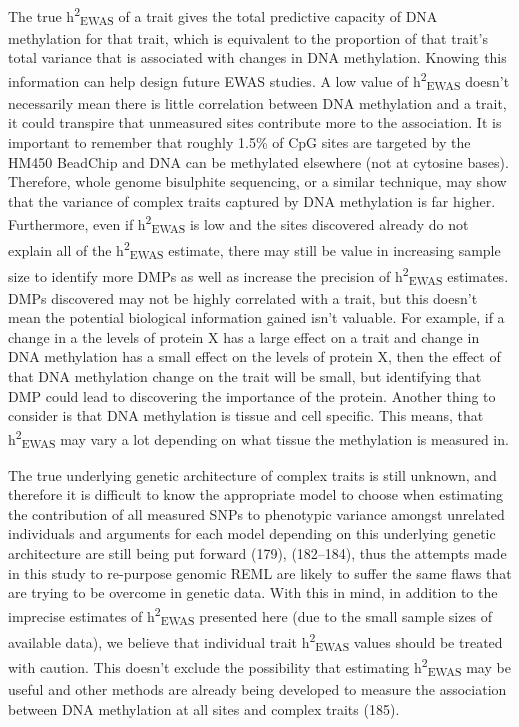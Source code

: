 \documentclass[11pt,oneside]{bristolthesis}
\begin{document}
The true h\textsuperscript{2}\textsubscript{EWAS} of a trait gives the total predictive capacity of DNA methylation for that trait, which is equivalent to the proportion of that trait's total variance that is associated with changes in DNA methylation. Knowing this information can help design future EWAS studies. A low value of h\textsuperscript{2}\textsubscript{EWAS} doesn't necessarily mean there is little correlation between DNA methylation and a trait, it could transpire that unmeasured sites contribute more to the association. It is important to remember that roughly 1.5\% of CpG sites are targeted by the HM450 BeadChip and DNA can be methylated elsewhere (not at cytosine bases). Therefore, whole genome bisulphite sequencing, or a similar technique, may show that the variance of complex traits captured by DNA methylation is far higher. Furthermore, even if h\textsuperscript{2}\textsubscript{EWAS} is low and the sites discovered already do not explain all of the h\textsuperscript{2}\textsubscript{EWAS} estimate, there may still be value in increasing sample size to identify more DMPs as well as increase the precision of h\textsuperscript{2}\textsubscript{EWAS} estimates. DMPs discovered may not be highly correlated with a trait, but this doesn't mean the potential biological information gained isn't valuable. For example, if a change in a the levels of protein X has a large effect on a trait and change in DNA methylation has a small effect on the levels of protein X, then the effect of that DNA methylation change on the trait will be small, but identifying that DMP could lead to discovering the importance of the protein. Another thing to consider is that DNA methylation is tissue and cell specific. This means, that h\textsuperscript{2}\textsubscript{EWAS} may vary a lot depending on what tissue the methylation is measured in.

The true underlying genetic architecture of complex traits is still unknown, and therefore it is difficult to know the appropriate model to choose when estimating the contribution of all measured SNPs to phenotypic variance amongst unrelated individuals and arguments for each model depending on this underlying genetic architecture are still being put forward (179), (182--184), thus the attempts made in this study to re-purpose genomic REML are likely to suffer the same flaws that are trying to be overcome in genetic data. With this in mind, in addition to the imprecise estimates of h\textsuperscript{2}\textsubscript{EWAS} presented here (due to the small sample sizes of available data), we believe that individual trait h\textsuperscript{2}\textsubscript{EWAS} values should be treated with caution. This doesn't exclude the possibility that estimating h\textsuperscript{2}\textsubscript{EWAS} may be useful and other methods are already being developed to measure the association between DNA methylation at all sites and complex traits (185).
\end{document}
